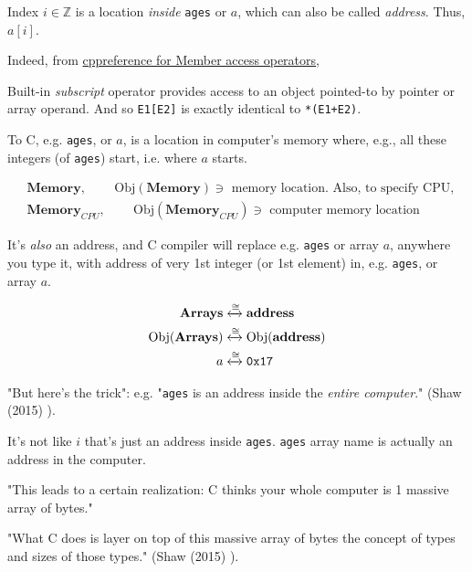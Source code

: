 \documentclass[10pt]{amsart}
\begin{document}
\begin{multicols*}{2}
Index $i\in \mathbb{Z}$ is a location \emph{inside} \verb|ages| or $a$, which can also be called \emph{address}.  Thus, $a[i]$.  

Indeed, from \href{http://en.cppreference.com/w/cpp/language/operator_member_access}{cppreference for Member access operators}, 

Built-in \emph{subscript} operator provides access to an object pointed-to by pointer or array operand.  And so \verb|E1[E2]| is exactly identical to \verb|*(E1+E2)|.  


To C, e.g. \verb|ages|, or $a$, is a location in computer's memory where, e.g., all these integers (of \verb|ages|) start, i.e. where $a$ starts.  

\[
\begin{aligned}
& \textbf{Memory} , \qquad \, \text{Obj}{(\textbf{Memory})} \ni \text{ memory location.  Also, to specify CPU, } \\ 
& \textbf{Memory}_{CPU} , \qquad \, \text{Obj}{(\textbf{Memory}_{CPU})} \ni \text{ computer memory location }
\end{aligned}
\]

It's \emph{also} an address, and C compiler will replace e.g. \verb|ages| or array $a$, anywhere you type it, with address of very 1st integer (or 1st element) in, e.g. \verb|ages|, or array $a$.  

\[
\begin{gathered}
\begin{aligned}
\textbf{Arrays} & \xleftrightarrow{ \cong } \textbf{address}  \\
\text{Obj}{(\textbf{Arrays} )} & \xleftrightarrow{ \cong } \text{Obj}{(\textbf{address} )}  \\
a & \xleftrightarrow{ \cong } \verb|0x17|  \\
\end{aligned}
\end{gathered}
\]

"But here's the trick": e.g. "\verb|ages| is an address inside the \emph{entire computer}." (Shaw (2015) \cite{Shaw2015}).  

It's not like $i$ that's just an address inside \verb|ages|.  \verb|ages| array name is actually an address in the computer.     

"This leads to a certain realization: C thinks your whole computer is 1 massive array of bytes."  

"What C does is layer on top of this massive array of bytes the concept of types and sizes of those types." (Shaw (2015) \cite{Shaw2015}).  



\end{multicols*}
\end{document}
